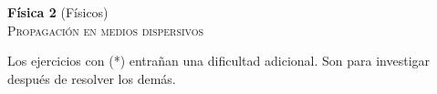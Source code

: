 \documentclass[11pt,spanish,a4paper]{article}
\begin{document}
\begin{center}
\textbf{Física 2} (Físicos) \hfill {}\\
	\textsc{\LARGE Propagación en medios dispersivos}
\end{center}

Los ejercicios con (*) entrañan una dificultad adicional. Son para investigar después de resolver los demás.



\begin{enumerate}


}

}



\end{enumerate}
\end{document}
